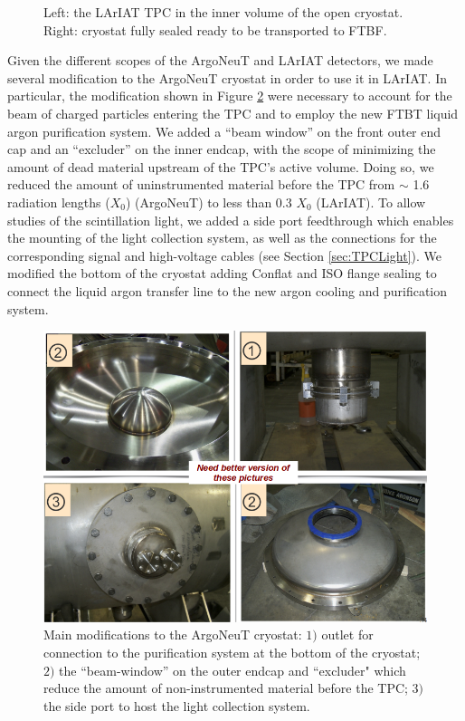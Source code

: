 \begin{figure}[htb]
\caption{ Left: the LArIAT TPC in the inner volume of the open cryostat. Right: cryostat fully sealed ready to be transported to FTBF. }
\label{fig:LArIATCryoStat}
\end{figure}

Given the different scopes of the ArgoNeuT and LArIAT detectors, we made several modification to the ArgoNeuT cryostat in order to use it in LArIAT. In particular, the modification  shown in Figure \ref{fig:LArIATCryoMods} were necessary to account for the beam of charged particles entering the TPC and to employ the new FTBT liquid argon purification system. 
We added a ``beam window'' on the front outer end cap and an ``excluder'' on the inner endcap, with the scope of minimizing the amount of dead material upstream of the TPC's active volume.  Doing so, we reduced the amount of uninstrumented material before the TPC from $\sim$ 1.6 radiation lengths ($X_{0}$) (ArgoNeuT) to less than 0.3 $X_{0}$ (LArIAT). To allow studies of the scintillation light, we added a side port feedthrough which enables the mounting of the light collection system, as well as the connections for the corresponding signal and high-voltage cables (see Section \ref{sec:TPCLight}).  We modified the bottom of the cryostat adding Conflat and ISO flange sealing to connect the liquid argon transfer line to the new argon cooling and purification system.


\begin{figure}[htb]
\centering
\includegraphics[scale=0.35]{Chapter-3/Images/CryoMods.png}
\caption{Main modifications to the ArgoNeuT cryostat: $1)$ outlet for connection to the purification system at the bottom of the cryostat; $2)$ the ``beam-window'' on the outer endcap and ``excluder"  which reduce the amount of non-instrumented material before the TPC; $3)$ the side port to host  the  light collection system.}
\label{fig:LArIATCryoMods}
\end{figure}

